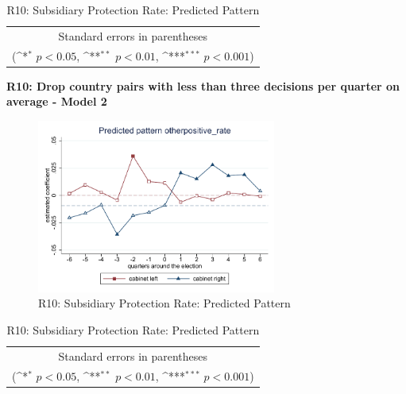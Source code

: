 \documentclass[10pt,a4paper]{scrartcl}
\begin{document}
\begin{table}[!ht]\centering
	\renewcommand{\arraystretch}{1.25}
	\def\sym#1{\ifmmode^{#1}\else\(^{#1}\)\fi}
	\caption{R10: Subsidiary Protection Rate: Predicted Pattern}
	\begin{tabular}{l*{2}{c}}
		\hline\hline
		
		\hline\hline
		\multicolumn{3}{c}{\footnotesize Standard errors in parentheses} \\
		\multicolumn{3}{c}{\footnotesize (\sym{*} \(p<0.05\), \sym{**} \(p<0.01\), \sym{***} \(p<0.001\))}\\
	\end{tabular}
\end{table}

\clearpage
\textbf{R10: Drop country pairs with less than three decisions per quarter on average - Model 2}
\begin{figure}[!ht]
	\centering
	\includegraphics[width=0.7\textwidth]{figures_edited/otherpositive_rate_graph2_R10.pdf}
	\caption{R10: Subsidiary Protection Rate: Predicted Pattern}
\end{figure}

\begin{table}[!ht]\centering
	\footnotesize
	\renewcommand{\arraystretch}{1.2}
	\def\sym#1{\ifmmode^{#1}\else\(^{#1}\)\fi}
	\caption{R10: Subsidiary Protection Rate: Predicted Pattern}
	\begin{tabular}{l*{2}{c}}
		\hline\hline
		
		\hline\hline
		\multicolumn{3}{c}{\footnotesize Standard errors in parentheses} \\
		\multicolumn{3}{c}{\footnotesize (\sym{*} \(p<0.05\), \sym{**} \(p<0.01\), \sym{***} \(p<0.001\))} \\
	\end{tabular}
\end{table}
\end{document}
